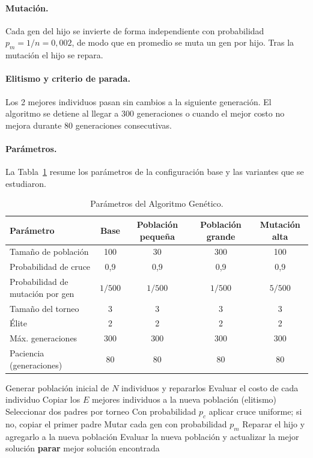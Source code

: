 \paragraph{Mutación.}
Cada gen del hijo se invierte de forma independiente con probabilidad $p_m=1/n=0{,}002$, de modo que en promedio se muta un gen por hijo. Tras la mutación el hijo se repara.

\paragraph{Elitismo y criterio de parada.}
Los 2 mejores individuos pasan sin cambios a la siguiente generación. El algoritmo se detiene al llegar a 300 generaciones o cuando el mejor costo no mejora durante 80 generaciones consecutivas.

\paragraph{Parámetros.}
La Tabla~\ref{tab:params} resume los parámetros de la configuración base y las variantes que se estudiaron.

\begin{table}[H]
\centering
\caption{Parámetros del Algoritmo Genético.}
\label{tab:params}
\begin{tabular}{lcccc}
\toprule
Parámetro & Base & Población pequeña & Población grande & Mutación alta\\
\midrule
Tamaño de población & 100 & 30 & 300 & 100\\
Probabilidad de cruce & 0,9 & 0,9 & 0,9 & 0,9\\
Probabilidad de mutación por gen & $1/500$ & $1/500$ & $1/500$ & $5/500$\\
Tamaño del torneo & 3 & 3 & 3 & 3\\
Élite & 2 & 2 & 2 & 2\\
Máx. generaciones & 300 & 300 & 300 & 300\\
Paciencia (generaciones) & 80 & 80 & 80 & 80\\
\bottomrule
\end{tabular}
\end{table}

\begin{algorithm}[H]
\caption{Algoritmo Genético con reparación para el Set Cover}
\begin{algorithmic}[1]
\State Generar población inicial de $N$ individuos y repararlos
\State Evaluar el costo de cada individuo
  \State Copiar los $E$ mejores individuos a la nueva población (elitismo)
    \State Seleccionar dos padres por torneo
    \State Con probabilidad $p_c$ aplicar cruce uniforme; si no, copiar el primer padre
    \State Mutar cada gen con probabilidad $p_m$
    \State Reparar el hijo y agregarlo a la nueva población
  \EndWhile
  \State Evaluar la nueva población y actualizar la mejor solución
   \State \textbf{parar} \EndIf
\EndFor
\State \Return mejor solución encontrada
\end{algorithmic}
\end{algorithm}

